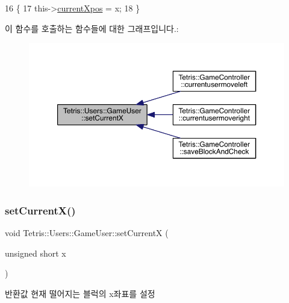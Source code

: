 \begin{DoxyCode}
16                                                           \{
17                     this->\hyperlink{class_tetris_1_1_users_1_1_game_user_a3edcace8f88494f9cee4ba99ba9b6c87}{currentXpos} = x;
18                 \}
\end{DoxyCode}
이 함수를 호출하는 함수들에 대한 그래프입니다.\+:
\nopagebreak
\begin{figure}[H]
\begin{center}
\leavevmode
\includegraphics[width=350pt]{d8/d9a/class_tetris_1_1_users_1_1_game_user_a2957358b1a6298f06c6c2e10cb89f623_icgraph}
\end{center}
\end{figure}
\mbox{\label{class_tetris_1_1_users_1_1_game_user_a2957358b1a6298f06c6c2e10cb89f623}} 
\subsubsection{\texorpdfstring{set\+Current\+X()}{setCurrentX()}\hspace{0.1cm}{\footnotesize\ttfamily [2/2]}}
{\footnotesize\ttfamily void Tetris\+::\+Users\+::\+Game\+User\+::set\+CurrentX (\begin{DoxyParamCaption}\item[{unsigned short}]{x }\end{DoxyParamCaption})\hspace{0.3cm}{\ttfamily [inline]}}

\begin{DoxyReturn}{반환값}
현재 떨어지는 블럭의 x좌표를 설정 
\end{DoxyReturn}


